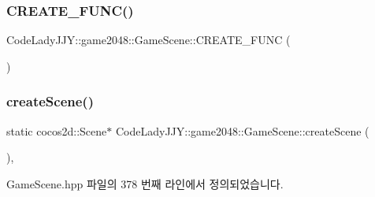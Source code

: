 \subsubsection{\texorpdfstring{C\+R\+E\+A\+T\+E\+\_\+\+F\+U\+N\+C()}{CREATE\_FUNC()}}
{\footnotesize\ttfamily Code\+Lady\+J\+J\+Y\+::game2048\+::\+Game\+Scene\+::\+C\+R\+E\+A\+T\+E\+\_\+\+F\+U\+NC (\begin{DoxyParamCaption}\item[{\hyperlink{class_code_lady_j_j_y_1_1game2048_1_1_game_scene}{Game\+Scene}}]{ }\end{DoxyParamCaption})}

\mbox{\label{class_code_lady_j_j_y_1_1game2048_1_1_game_scene_ab573bac307156883fc8c632821b061e4}} 
\subsubsection{\texorpdfstring{create\+Scene()}{createScene()}}
{\footnotesize\ttfamily static cocos2d\+::\+Scene$\ast$ Code\+Lady\+J\+J\+Y\+::game2048\+::\+Game\+Scene\+::create\+Scene (\begin{DoxyParamCaption}{ }\end{DoxyParamCaption})\hspace{0.3cm}{\ttfamily [inline]}, {\ttfamily [static]}}



Game\+Scene.\+hpp 파일의 378 번째 라인에서 정의되었습니다.


